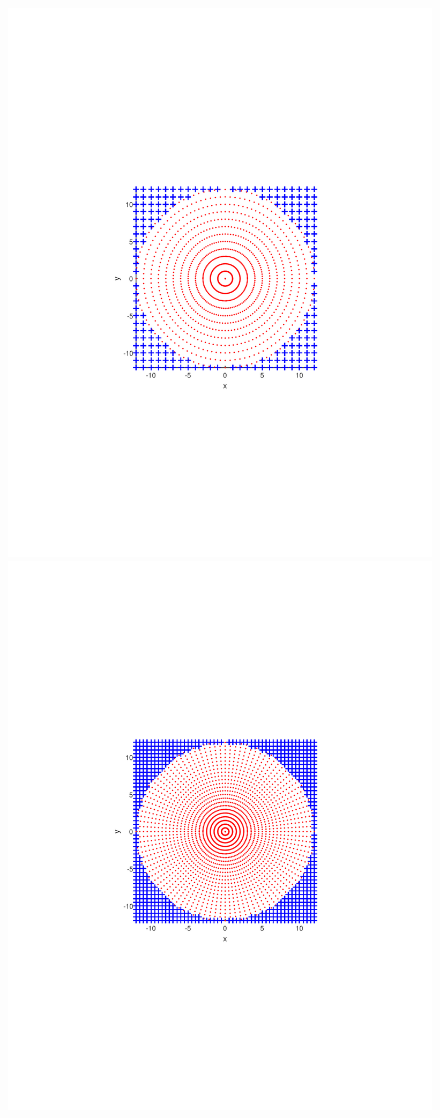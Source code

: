 \documentclass{UCF_ETD}
\begin{document}
\begin{figure}[H]
\begin{center}
 \includegraphics[scale=0.5]{PolarSphericalDFT/PolarWithCartesianCorner}
 \includegraphics[scale=0.5]{PolarSphericalDFT/PolarWithCartesianCornerx2}

\end{center}
\end{figure}
\end{document}
